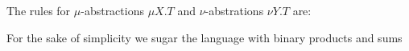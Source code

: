 \vspace*{0.3cm}
The rules for $\mu$-abstractions $\mu X.T$ and $\nu$-abstrations $\nu Y.T$ are:

\vspace*{0.3cm}
\begin{minipage}{0.45\textwidth}
  \begin{prooftree}
  \end{prooftree}
\end{minipage}
\begin{minipage}{0.45\textwidth}
  \begin{prooftree}
  \end{prooftree}
\end{minipage}

\vspace*{0.3cm}
\begin{minipage}{0.45\textwidth}
  \begin{prooftree}
  \end{prooftree}
\end{minipage}
\begin{minipage}{0.45\textwidth}
  \begin{prooftree}
  \end{prooftree}
\end{minipage}

\vspace*{0.3cm}
For the sake of simplicity we sugar the language with binary products and sums

